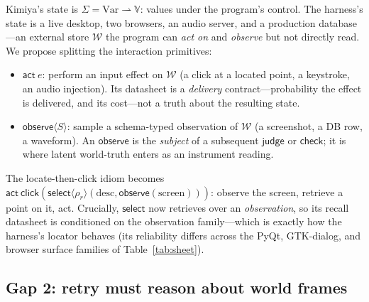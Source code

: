 \documentclass[acmsmall,screen,nonacm]{acmart}
\newcommand{\checkk}{\mathsf{check}}
\newcommand{\judge}{\mathsf{judge}}
\newcommand{\select}{\mathsf{select}}
\newcommand{\actc}{\mathsf{act}}
\newcommand{\observe}{\mathsf{observe}}
\newcommand{\worldstore}{\mathcal{W}}
\theoremstyle{acmdefinition}%
\theoremstyle{acmplain}%
\begin{document}
Kimiya's state is $\Sigma=\mathrm{Var}\rightharpoonup\mathbb{V}$: values
under the program's control. The harness's state is a live desktop, two
browsers, an audio server, and a production database---an external store
$\worldstore$ the program can \emph{act on} and \emph{observe} but not
directly read. We propose splitting the interaction primitives:
\begin{itemize}
\item $\actc\ e$: perform an input effect on $\worldstore$ (a click at a
located point, a keystroke, an audio injection). Its datasheet is a
\emph{delivery} contract---probability the effect is delivered, and its
cost---not a truth about the resulting state.
\item $\observe\langle S\rangle$: sample a schema-typed observation of
$\worldstore$ (a screenshot, a DB row, a waveform). An $\observe$ is the
\emph{subject} of a subsequent $\judge$ or $\checkk$; it is where latent
world-truth enters as an instrument reading.
\end{itemize}
The locate-then-click idiom becomes $\actc\
\mathsf{click}(\select\langle\rho_r\rangle(\text{desc},\observe(\text{screen})))$:
observe the screen, retrieve a point on it, act. Crucially, $\select$ now
retrieves over an \emph{observation}, so its recall datasheet is
conditioned on the observation family---which is exactly how the harness's
locator behaves (its reliability differs across the PyQt, GTK-dialog, and
browser surface families of Table~\ref{tab:sheet}).

\subsection{Gap 2: retry must reason about world frames}
\label{sec:worldretry}
\end{document}

